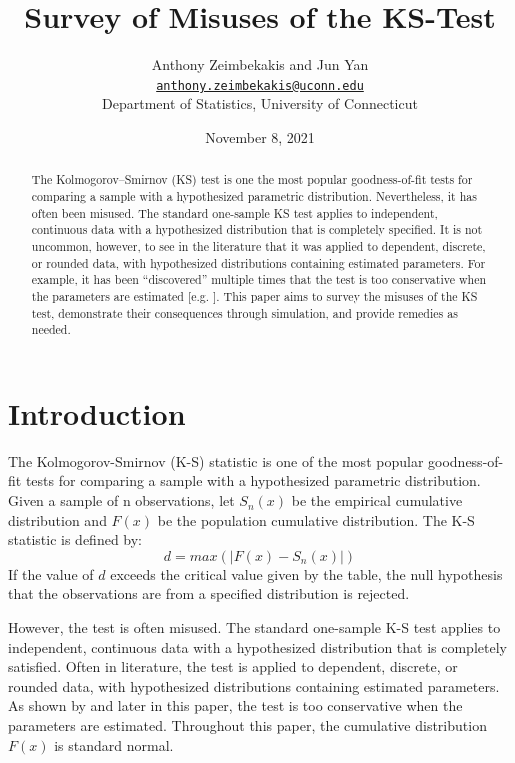 \documentclass[12pt, letterpaper, titlepage]{article}
\title{Survey of Misuses of the KS-Test}
\author{Anthony Zeimbekakis and Jun Yan\\
\href{mailto:anthony.zeimbekakis@uconn.edu}{\nolinkurl{anthony.zeimbekakis@uconn.edu}}\\
Department of Statistics, University of Connecticut}
\date{November 8, 2021}
\begin{document}
\maketitle

\doublespace

\begin{abstract}
The Kolmogorov–Smirnov (KS) test is one the most popular goodness-of-fit tests for comparing a sample with a hypothesized parametric distribution. Nevertheless, it has often been misused. The standard one-sample KS test applies to independent, continuous data with a hypothesized distribution that is completely specified. It is not uncommon, however, to see in the literature that it was applied to dependent, discrete, or rounded data, with hypothesized distributions containing estimated parameters. For example, it has been “discovered” multiple times that the test is too conservative when the parameters are estimated [e.g. \citet{Steinskog}]. This paper aims to survey the misuses of the KS test, demonstrate their consequences through simulation, and provide remedies as needed.
\end{abstract}


\hypertarget{sec:intro}{%
\section{Introduction}\label{sec:intro}}

The Kolmogorov-Smirnov (K-S) statistic is one of the most popular goodness-of-fit tests for comparing a sample with a hypothesized parametric distribution. Given a sample of n observations, let $S_{n}(x)$ be the empirical cumulative distribution and $F(x)$ be the population cumulative distribution. The K-S statistic is defined by: \[d = max(\lvert F(x)-S_{n}(x) \rvert)\] If the value of $d$ exceeds the critical value given by the table, the null hypothesis that the observations are from a specified distribution is rejected. 

However, the test is often misused. The standard one-sample K-S test applies to independent, continuous data with a hypothesized distribution that is completely satisfied. Often in literature, the test is applied to dependent, discrete, or rounded data, with hypothesized distributions containing estimated parameters. As shown by \citet{Steinskog} and later in this paper, the test is too conservative when the parameters are estimated. Throughout this paper, the cumulative distribution $F(x)$ is standard normal.
\end{document}
